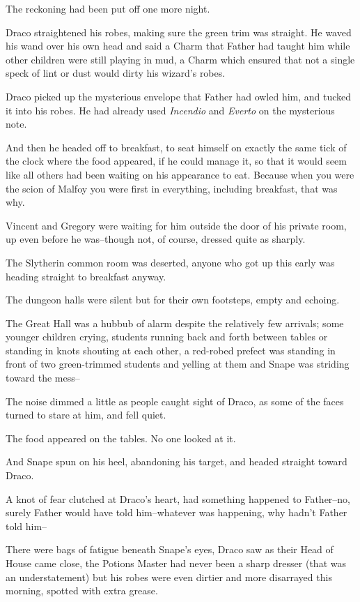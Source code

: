 The reckoning had been put off one more night.


Draco straightened his robes, making sure the green trim was straight. He waved his wand over his own head and said a Charm that Father had taught him while other children were still playing in mud, a Charm which ensured that not a single speck of lint or dust would dirty his wizard's robes.

Draco picked up the mysterious envelope that Father had owled him, and tucked it into his robes. He had already used \emph{Incendio} and \emph{Everto} on the mysterious note.

And then he headed off to breakfast, to seat himself on exactly the same tick of the clock where the food appeared, if he could manage it, so that it would seem like all others had been waiting on his appearance to eat. Because when you were the scion of Malfoy you were first in everything, including breakfast, that was why.

Vincent and Gregory were waiting for him outside the door of his private room, up even before he was\---though not, of course, dressed quite as sharply.

The Slytherin common room was deserted, anyone who got up this early was heading straight to breakfast anyway.

The dungeon halls were silent but for their own footsteps, empty and echoing.

The Great Hall was a hubbub of alarm despite the relatively few arrivals; some younger children crying, students running back and forth between tables or standing in knots shouting at each other, a red-robed prefect was standing in front of two green-trimmed students and yelling at them and Snape was striding toward the mess\---

The noise dimmed a little as people caught sight of Draco, as some of the faces turned to stare at him, and fell quiet.

The food appeared on the tables. No one looked at it.

And Snape spun on his heel, abandoning his target, and headed straight toward Draco.

A knot of fear clutched at Draco's heart, had something happened to Father\---no, surely Father would have told him\---whatever was happening, why hadn't Father told him\---

There were bags of fatigue beneath Snape's eyes, Draco saw as their Head of House came close, the Potions Master had never been a sharp dresser (that was an understatement) but his robes were even dirtier and more disarrayed this morning, spotted with extra grease.

